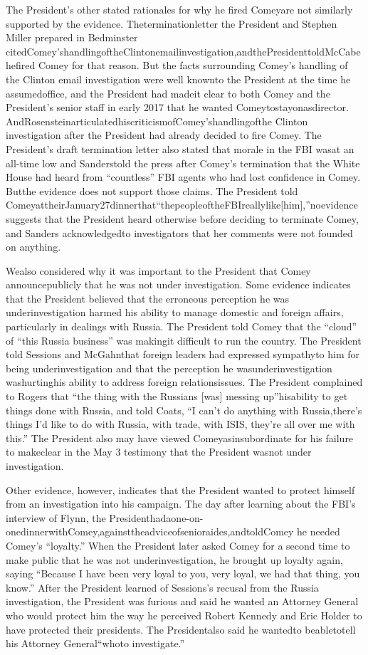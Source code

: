 {The President’s other stated rationales for why he fired Comeyare not similarly supported by the evidence.
Theterminationletter the President and Stephen Miller prepared in Bedminster citedComey’shandlingoftheClintonemailinvestigation,andthePresidenttoldMcCabehefired Comey for that reason.
But the facts surrounding Comey’s handling of the Clinton email investigation were well knownto the President at the time he assumedoffice, and the President had madeit clear to both Comey and the President’s senior staff in early 2017 that he wanted Comeytostayonasdirector.
AndRosensteinarticulatedhiscriticismofComey’shandlingofthe Clinton investigation after the President had already decided to fire Comey.
The President’s draft termination letter also stated that morale in the FBI wasat an all-time low and Sanderstold the press after Comey’s termination that the White House had heard from “countless” FBI agents who had lost confidence in Comey.
Butthe evidence does not support those claims.
The President told ComeyattheirJanuary27dinnerthat“thepeopleoftheFBIreallylike[him],”noevidence suggests that the President heard otherwise before deciding to terminate Comey, and Sanders acknowledgedto investigators that her comments were not founded on anything.

Wealso considered why it was important to the President that Comey announcepublicly that he was not under investigation.
Some evidence indicates that the President believed that the erroneous perception he was underinvestigation harmed his ability to manage domestic and foreign affairs, particularly in dealings with Russia.
The President told Comey that the “cloud” of “this Russia business” was makingit difficult to run the country.
The President told Sessions and McGahnthat foreign leaders had expressed sympathyto him for being underinvestigation and that the perception he wasunderinvestigation washurtinghis ability to address foreign relationsissues.
The President complained to Rogers that “the thing with the Russians [was] messing up”hisability to get things done with Russia, and told Coats, “I can’t do anything with Russia,there’s things I'd
like to do with Russia, with trade, with ISIS, they’re all over me with this.”
The President also may have viewed Comeyasinsubordinate for his failure to makeclear in the May 3 testimony that the President wasnot under investigation.

Other evidence, however, indicates that the President wanted to protect himself from an investigation into his campaign.
The day after learning about the FBI’s interview of Flynn, the Presidenthadaone-on-onedinnerwithComey,againsttheadviceofsenioraides,andtoldComey he needed Comey’s “loyalty.”
When the President later asked Comey for a second time to make public that he was not underinvestigation, he brought up loyalty again, saying “Because I have been very loyal to you, very loyal, we had that thing, you know.”
After the President learned of Sessions’s recusal from the Russia investigation, the President was furious and said he wanted an Attorney General who would protect him the way he perceived Robert Kennedy and Eric Holder to have protected their presidents.
The Presidentalso said he wantedto beabletotell his Attorney General“whoto investigate.”

}
